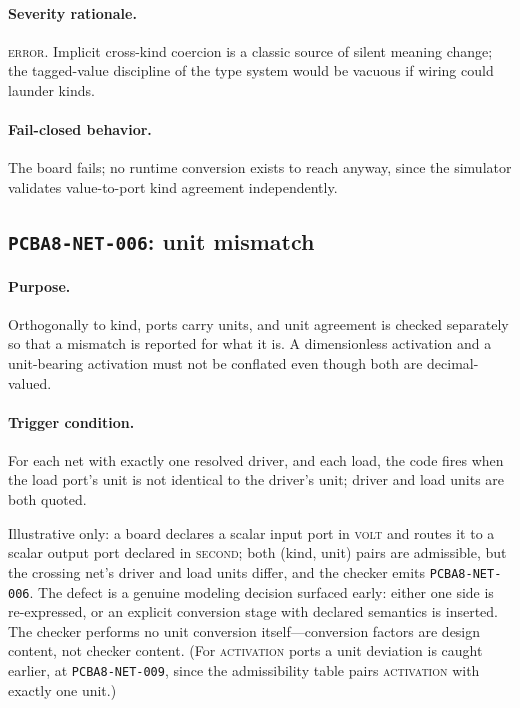 \paragraph{Severity rationale.} \textsc{error}. Implicit cross-kind coercion is a classic source of silent meaning change; the tagged-value discipline of the type system would be vacuous if wiring could launder kinds.

\paragraph{Fail-closed behavior.} The board fails; no runtime conversion exists to reach anyway, since the simulator validates value-to-port kind agreement independently.

\subsection{\texttt{PCBA8-NET-006}: unit mismatch}\label{ch07:sub:net006}

\paragraph{Purpose.} Orthogonally to kind, ports carry units, and unit agreement is checked separately so that a mismatch is reported for what it is. A dimensionless activation and a unit-bearing activation must not be conflated even though both are decimal-valued.

\paragraph{Trigger condition.} For each net with exactly one resolved driver, and each load, the code fires when the load port's unit is not identical to the driver's unit; driver and load units are both quoted.

\begin{example}\label{ch07:ex:net006}
Illustrative only: a board declares a scalar input port in \textsc{volt} and routes it to a scalar output port declared in \textsc{second}; both (kind, unit) pairs are admissible, but the crossing net's driver and load units differ, and the checker emits \texttt{PCBA8-NET-006}. The defect is a genuine modeling decision surfaced early: either one side is re-expressed, or an explicit conversion stage with declared semantics is inserted. The checker performs no unit conversion itself---conversion factors are design content, not checker content. (For \textsc{activation} ports a unit deviation is caught earlier, at \texttt{PCBA8-NET-009}, since the admissibility table pairs \textsc{activation} with exactly one unit.)
\end{example}

